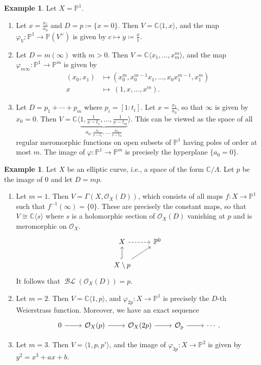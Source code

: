 \documentclass[10pt,letterpaper,cm]{nupset}
\theoremstyle{definition}
\newtheorem{exmp}[defn]{Example}
\theoremstyle{theorem}
\theoremstyle{remark}
\newcommand{\C}{\mathbb C}
\renewcommand{\O}{\mathcal O}
\renewcommand{\P}{\mathbb P}
\newcommand{\1}{\mathbb{1}}
\newcommand{\0}{\vec 0}
\DeclareMathOperator{\BL}{\mathcal{BL}}
\newcommand{\be}{\begin{enumerate}}
\newcommand{\ee}{\end{enumerate}}
\begin{document}
\begin{exmp} Let $X = \P^1$.
\be
\item Let $x= \frac{x_1}{x_0}$ and $D =p \coloneqq \{x=0\}$. Then $V = \C\langle 1, x \rangle$, and the map $\varphi_V : \P^1 \to \P\left(V^{\vee}\right)$ is given by $c\mapsto y\coloneqq \frac{x}{1}$.
\item Let $D = m\left(\infty\right)$ with $m>0$. Then $V= \C\langle x_1, \ldots, x_m^m\rangle$, and the map $\varphi_{m{\infty}} : \P^1 \to \P^m$ is given by
\begin{align*}
\left(x_0, x_1\right) & \mapsto \left(x_0^m, x_0^{m-1}x_1, \ldots, x_0x_1^{m-1}, x_1^m\right)
\\ x \ & \mapsto \  \left(1, x, \ldots, x^m\right).
\end{align*}
\item Let $D = p_1 + \cdots + p_m$ where $p_i = \left[1:t_i\right]$. Let $x = \frac{x_1}{x_0}$, so that $\infty$ is given by $x_0 =0$. Then $V = \C\langle \underbrace{1, \frac{1}{x-t_1}, \ldots, \frac{1}{x-t_m}}_{a_0, \frac{a_1}{x-t_1}, \ldots, \frac{a_m}{x-t_m}}\rangle$. This can be viewed as the space of all regular meromorphic functions on open subsets of $\P^1$ having poles of order at most $m$. The image of $\varphi : \P^1 \to \P^m$ is precisely the hyperplane $\{a_0 =0\}$.
\ee
\end{exmp}

\begin{exmp}
Let $X$ be an elliptic curve, i.e., a space of the form $\C/\Lambda$. Let $p$ be the image of $0$ and let $D = mp$. 
\be
\item Let $m =1$. Then $V = \Gamma\left(X, \O_X(D)\right)$, which consists of all maps $f: X \to \P^1$ such that $f^{-1}\left(\infty\right) = \{0\}$. These are precisely the constant maps, so that $V \cong \C\langle s\rangle$ where $s$ is a holomorphic section of $\O_X(D)$ vanishing at $p$ and is meromorphic on $\O_X$.
\[
\begin{tikzcd}
X \arrow[r, dashed]                     & \P^0 \\
X\setminus p \arrow[u, hook] \arrow[ru] &     
\end{tikzcd}
\]
It follows that  $\BL\left(\O_X(D)\right) =p$.
\item Let $m=2$. Then $V= \C\langle 1, p\rangle$, and $\varphi_{2p} : X \to \P^1$ is precisely the $D$-th Weierstrass function. Moreover, we have an exact sequence
\[
\begin{tikzcd}
0 \arrow[r] & \O_X(p) \arrow[r] & \O_X(2p) \arrow[r] & \O_p \arrow[r] & \cdots
\end{tikzcd}.
\]
\item Let $m=3$. Then $V = \langle 1, p, p'\rangle$, and the image of $\varphi_{3p} :X \to \P^2$ is given by $y^2 = x^3+ax+b$. 
\ee
\end{exmp}
\end{document}
